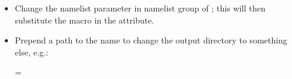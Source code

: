 \begin{itemize}
    \item Change the namelist parameter  in namelist group  of ; this will then substitute the  macro in the  attribute.
    \item Prepend a path to the name to change the output directory to something else, e.g.:

\begingroup\small
\begin{VerbatimXML}
=
\end{VerbatimXML}
\endgroup

\end{itemize}